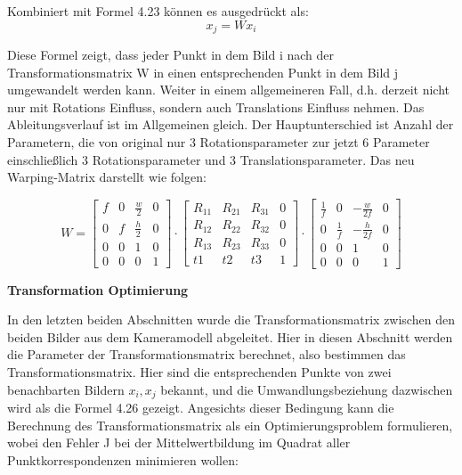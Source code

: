 Kombiniert mit Formel 4.23 können es ausgedrückt als:
\begin{equation}
   x_j = Wx_i
\end{equation}

Diese Formel zeigt, dass jeder Punkt in dem Bild i nach der Transformationsmatrix W in einen entsprechenden Punkt in dem Bild j umgewandelt werden kann. Weiter in einem allgemeineren Fall, d.h. derzeit nicht nur mit Rotations Einfluss, sondern auch Translations Einfluss nehmen. Das Ableitungsverlauf ist im Allgemeinen gleich. Der Hauptunterschied ist Anzahl der Parametern, die von original nur 3 Rotationsparameter zur jetzt 6 Parameter einschließlich 3 Rotationsparameter und 3 Translationsparameter. Das neu Warping-Matrix darstellt wie folgen:

\begin{equation}
   W = \begin{bmatrix}
	f			& 0 		& \frac{w}{2}	  & 0 \\
	0	 		& f			& \frac{h}{2} 	  & 0 \\
	0     		& 0 		& 1 			  & 0 \\	
	0     		& 0 		& 0 			  & 1
	\end{bmatrix} \cdot \begin{bmatrix}
	R_{11}			& R_{21}  		& R_{31}	  & 0 \\
	R_{12}	 		& R_{22}		& R_{32}	  & 0 \\
	R_{13}     		& R_{23} 		& R_{33} 	  & 0 \\	
	t1     			& t2 			& t3 		  & 1
	\end{bmatrix} \cdot \begin{bmatrix}
	\frac{1}{f}	   & 0 				& -\frac{w}{2f}	  & 0 \\
	0	 		   & \frac{1}{f}	& -\frac{h}{2f}   & 0 \\
	0     		   & 0 		        & 1 			  & 0 \\	
	0     		   & 0 		        & 0 			  & 1
	\end{bmatrix}
\end{equation}

\textbf{Transformation Optimierung}

In den letzten beiden Abschnitten wurde die Transformationsmatrix zwischen den beiden Bilder aus dem Kameramodell abgeleitet. Hier in diesen Abschnitt werden die Parameter der Transformationsmatrix berechnet, also bestimmen das Transformationsmatrix. Hier sind die entsprechenden Punkte von zwei benachbarten Bildern $x_i, x_j$ bekannt, und die Umwandlungsbeziehung dazwischen wird als die Formel 4.26 gezeigt. Angesichts dieser Bedingung 
kann die Berechnung des Transformationsmatrix als ein Optimierungsproblem formulieren, wobei den Fehler J bei der Mittelwertbildung im Quadrat aller Punktkorrespondenzen minimieren wollen:


